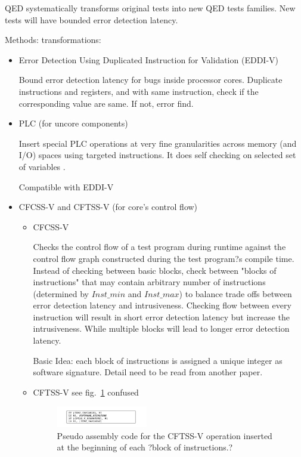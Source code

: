 \documentclass[conference]{IEEEtran}
\begin{document}
 QED systematically transforms original tests into new QED tests families.  New tests will have bounded error detection latency.
 
 Methods: transformations:
 \begin{itemize}
 
 \item Error Detection Using Duplicated Instruction for Validation (EDDI-V)
 
 Bound error detection latency for bugs inside processor cores. Duplicate instructions and registers, and with same instruction, check if the corresponding value are same. If not, error find.
 
 \item PLC (for uncore components)
 
 Insert special PLC operations at very fine granularities across memory (and I/O) spaces using targeted instructions. It does self checking on selected set of variables .
 
 Compatible with EDDI-V
 
 \item CFCSS-V and CFTSS-V (for core's control flow)
 
 \begin{itemize}
 \item CFCSS-V
 
Checks the control flow of a test program during runtime against the control flow graph constructed during the test program?s compile time. Instead of checking between basic blocks, check between "blocks of instructions" that may contain arbitrary number of instructions (determined by $Inst\_min$ and $Inst\_max$) to balance trade offs between error detection latency and intrusiveness. Checking flow between every instruction will result in short error detection latency but increase the intrusiveness. While multiple blocks will lead to longer error detection latency.

Basic Idea: each block of instructions is assigned a unique integer as software signature. {\color{red} Detail need to be read from another paper. }
\item CFTSS-V
 see fig.~\ref{cftss} {\color{red} confused}
 \begin{figure}
 \caption{Pseudo assembly code for the CFTSS-V operation inserted at the beginning of each ?block of instructions.?}
\label{cftss}
\centering
    \includegraphics[width=0.4\textwidth]{cftss}
\end{figure}
\end{itemize}


\end{itemize}
\end{document}
